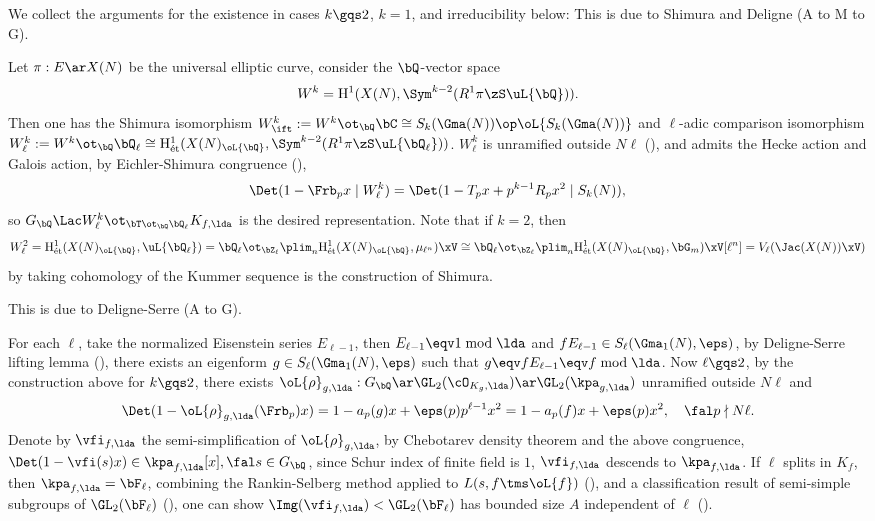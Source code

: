 \documentclass[a4paper, twoside]{article}
\begin{document}
\begin{prf}
	We collect the arguments for the existence in cases $k\gqs2$, $k=1$, and irreducibility below:
	 This is due to Shimura\cite{Shimura1971AF} and Deligne\cite{Deligne1971Formes} (A to M to G).

	Let $\pi:E\ar X(N)$ be the universal elliptic curve, consider the $\bQ$-vector space
	\[
		W^{k}=\mathrm{H}_{}^{1}(X(N),\Sym^{k-2}(R^{1}\pi\zS\uL{\bQ})).
	\]
	Then one has the Shimura isomorphism $W^{k}_{\ift}:=W^{k}\ot_{\bQ}\bC\cong S_{k}(\Gma(N))\op\oL{S_{k}(\Gma(N))}$ and $\ell$-adic comparison isomorphism $W^{k}_{\ell}:=W^{k}\ot_{\bQ}\bQ_{\ell}\cong\mathrm{H}_{\text{{\'e}t}}^{1}(X(N)_{\oL{\bQ}},\Sym^{k-2}(R^{1}\pi\zS\uL{\bQ_{\ell}}))$. $W^{k}_{\ell}$ is unramified outside $N\ell$ (\cite[4.2]{Deligne1971Formes}), and admits the Hecke action and Galois action, by Eichler-Shimura congruence (\cite[4.9]{Deligne1971Formes}),
	\[
		\Det(1-\Frb_{p}x\mid W^{k}_{\ell})=\Det(1-T_{p}x+p^{k-1}R_{p}x^{2}\mid S_{k}(N)),
	\]
	so $G_{\bQ}\Lac W^{k}_{\ell}\ot_{\bT\ot_{\bQ}\bQ_{\ell}}K_{f,\lda}$ is the desired representation. Note that if $k=2$, then
	\[
		W_{\ell}^{2}=\mathrm{H}_{\text{{\'e}t}}^{1}(X(N)_{\oL{\bQ}},\uL{\bQ_{\ell}}) = \bQ_{\ell}\ot_{\bZ_{\ell}}\plim_{n}\mathrm{H}_{\text{{\'e}t}}^{1}(X(N)_{\oL{\bQ}},\mu_{\ell^{n}})\xV \cong \bQ_{\ell}\ot_{\bZ_{\ell}}\plim_{n}\mathrm{H}_{\text{{\'e}t}}^{1}(X(N)_{\oL{\bQ}},\bG_{m})\xV[\ell^{n}] = V_{\ell}(\Jac(X(N))\xV)
	\]
	by taking cohomology of the Kummer sequence is the construction of Shimura\cite[7.23]{Shimura1971AF}.

	 This is due to Deligne-Serre\cite{DS1974} (A to G).

	For each $\ell$, take the normalized Eisenstein series $E_{\ell-1}$, then $E_{\ell-1}\eqv1\bmod{\lda}$ and $fE_{\ell-1}\in S_{\ell}(\Gma_{1}(N),\eps)$, by Deligne-Serre lifting lemma (\cite[6.11]{DS1974}), there exists an eigenform $g\in S_{\ell}(\Gma_{1}(N),\eps)$ such that $g\eqv fE_{\ell-1}\eqv f\bmod{\lda}$. Now $\ell\gqs2$, by the construction above for $k\gqs2$, there exists $\oL{\rho}_{g,\lda}:G_{\bQ}\ar\GL_{2}(\cO_{K_{g},\lda})\ar\GL_{2}(\kpa_{g,\lda})$ unramified outside $N\ell$ and
	\[
		\Det(1-\oL{\rho}_{g,\lda}(\Frb_{p})x)=1-a_{p}(g)x+\eps(p)p^{\ell-1}x^{2}=1-a_{p}(f)x+\eps(p)x^{2},\quad \fal p\nmid N\ell.
	\]
	Denote by $\vfi_{f,\lda}$ the semi-simplification of $\oL{\rho}_{g,\lda}$, by Chebotarev density theorem and the above congruence, $\Det(1-\vfi(s)x)\in\kpa_{f,\lda}[x],\fal s\in G_{\bQ}$, since Schur index of finite field is $1$, $\vfi_{f,\lda}$ descends to $\kpa_{f,\lda}$. If $\ell$ splits in $K_{f}$, then $\kpa_{f,\lda}=\bF_{\ell}$, combining the Rankin-Selberg method applied to $L(s,f\tms\oL{f})$ (\cite[5.5, 8.3]{DS1974}), and a classification result of semi-simple subgroups of $\GL_{2}(\bF_{\ell})$ (\cite[7.2]{DS1974}), one can show $\Img(\vfi_{f,\lda})<\GL_{2}(\bF_{\ell})$ has bounded size $A$ independent of $\ell$ (\cite[8.4]{DS1974}).


\end{prf}
\end{document}
